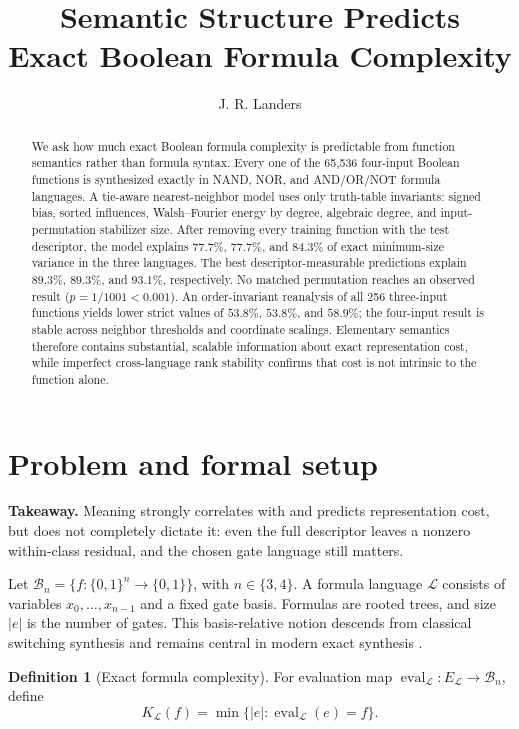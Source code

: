 \documentclass[10pt]{article}
\title{\vspace{-1.7em}\textbf{Semantic Structure Predicts}\\[-1pt]
\textbf{Exact Boolean Formula Complexity}}
\author{J. R. Landers}
\date{\vspace{-1.4em}}
\theoremstyle{definition}
\newtheorem{definition}[theorem]{Definition}
\begin{document}
\maketitle
\vspace{-1.6em}

\begin{abstract}
We ask how much exact Boolean formula complexity is predictable from function
semantics rather than formula syntax.  Every one of the 65,536 four-input
Boolean functions is synthesized exactly in NAND, NOR, and AND/OR/NOT formula
languages.  A tie-aware nearest-neighbor model uses only truth-table
invariants: signed bias, sorted influences, Walsh--Fourier energy by degree,
algebraic degree, and input-permutation stabilizer size.  After removing every
training function with the test descriptor, the model explains $77.7\%$,
$77.7\%$, and $84.3\%$ of exact minimum-size variance in the three languages.
The best descriptor-measurable predictions explain $89.3\%$, $89.3\%$, and
$93.1\%$, respectively.  No matched permutation reaches an observed result
($p=1/1001<0.001$).  An order-invariant reanalysis of all 256 three-input
functions yields lower strict values of $53.8\%$, $53.8\%$, and $58.9\%$;
the four-input result is stable across neighbor thresholds and coordinate
scalings.  Elementary semantics therefore contains substantial, scalable
information about exact representation cost, while imperfect cross-language
rank stability confirms that cost is not intrinsic to the function alone.
\end{abstract}

\section{Problem and formal setup}

\textbf{Takeaway.} Meaning strongly correlates with and predicts representation
cost, but does not completely dictate it: even the full descriptor leaves a
nonzero within-class residual, and the chosen gate language still matters.

Let $\mathcal B_n=\{f:\{0,1\}^n\to\{0,1\}\}$, with $n\in\{3,4\}$.
A formula language $\mathcal L$ consists of variables $x_0,\ldots,x_{n-1}$ and
a fixed gate basis.  Formulas are rooted trees, and size $|e|$ is the number of
gates.  This basis-relative notion descends from classical switching synthesis
\cite{shannon1949} and remains central in modern exact synthesis
\cite{haaswijk2020,panchu2023}.

\begin{definition}[Exact formula complexity]
For evaluation map $\operatorname{eval}_{\mathcal L}:E_{\mathcal L}\to
\mathcal B_n$, define
\[
 K_{\mathcal L}(f)=\min\{|e|:
 \operatorname{eval}_{\mathcal L}(e)=f\}.
 \tag{1}
\]
\end{definition}
\end{document}
